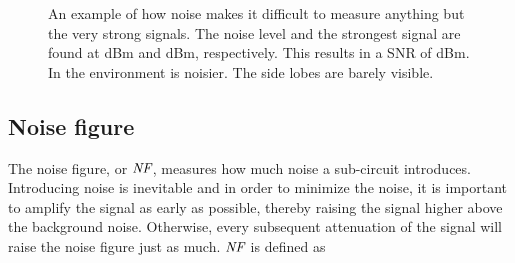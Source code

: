 			\begin{figure}[hb!!!]
				\centering
				\caption[Example of signal plus noise.]{ An example of how noise makes it difficult to measure anything but the very strong signals. The noise level and the strongest signal are found at \unit[20]{dBm} and \unit[87]{dBm}, respectively. This results in a SNR of \unit[67]{dBm}. In  the environment is noisier. The side lobes are barely visible.}\label{fig:noise_example}
			\end{figure}

		\subsection{Noise figure}
			The noise figure, or $\emph{NF}$, measures how much noise a sub-circuit introduces. Introducing noise is inevitable and in order to minimize the noise, it is important to amplify the signal as early as possible, thereby raising the signal higher above the background noise. Otherwise, every subsequent attenuation of the signal will raise the noise figure just as much. $\emph{NF}$ is defined as

